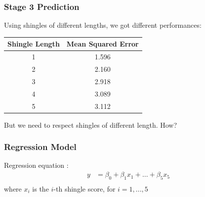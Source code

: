 \documentclass[11pt]{beamer}
\begin{document}
\begin{frame}
\frametitle{Stage 3 Prediction}

	Using shingles of different lengths, we got different performances:

	\begin{center}
		\begin{tabular}{cc}
			\toprule
				Shingle Length & Mean Squared Error \\
			\midrule
				1 & 1.596 \\
				2 & 2.160 \\
				3 & 2.918 \\
				4 & 3.089 \\
				5 & 3.112 \\
			\bottomrule
		\end{tabular}
	\end{center}
	\vspace{5mm}
	But we need to respect shingles of different length. How?

\end{frame}

\begin{frame}
\frametitle{Regression Model}
\begin{tcolorbox}[colback=blue!5,colframe=blue!40!black,title=Regression model]
Regression equation :
\begin{equation}
\begin{alignedat}{1}
y &= \beta_0  + \beta_1 x_1 + \dots + \beta_5 x_5\\
\end{alignedat}
\end{equation}
where $x_i$ is the $i$-th shingle score, for $i=1,...,5$
\end{tcolorbox}
\end{frame}
\end{document}
